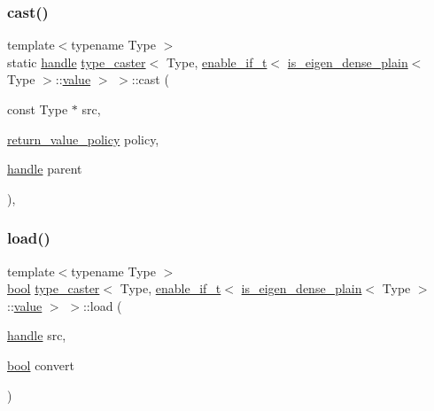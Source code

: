 \subsubsection{\texorpdfstring{cast()}{cast()}\hspace{0.1cm}{\footnotesize\ttfamily [6/6]}}
{\footnotesize\ttfamily template$<$typename Type $>$ \\
static \mbox{\hyperlink{classhandle}{handle}} \mbox{\hyperlink{classtype__caster}{type\+\_\+caster}}$<$ Type, \mbox{\hyperlink{detail_2common_8h_a012819c9e8b5e04872a271f50f8b8196}{enable\+\_\+if\+\_\+t}}$<$ \mbox{\hyperlink{eigen_8h_a93c6985faade6e9052f9e0917826b26d}{is\+\_\+eigen\+\_\+dense\+\_\+plain}}$<$ Type $>$\+::\mbox{\hyperlink{_s_d_l__opengl__glext_8h_a8ad81492d410ff2ac11f754f4042150f}{value}} $>$ $>$\+::cast (\begin{DoxyParamCaption}\item[{const Type $\ast$}]{src,  }\item[{\mbox{\hyperlink{detail_2common_8h_adde72ab1fb0dd4b48a5232c349a53841}{return\+\_\+value\+\_\+policy}}}]{policy,  }\item[{\mbox{\hyperlink{classhandle}{handle}}}]{parent }\end{DoxyParamCaption})\hspace{0.3cm}{\ttfamily [inline]}, {\ttfamily [static]}}

\mbox{\label{structtype__caster_3_01_type_00_01enable__if__t_3_01is__eigen__dense__plain_3_01_type_01_4_1_1value_01_4_01_4_a685eaafb5ace9e29ba92080349ee523d}} 
\subsubsection{\texorpdfstring{load()}{load()}}
{\footnotesize\ttfamily template$<$typename Type $>$ \\
\mbox{\hyperlink{asdl_8h_af6a258d8f3ee5206d682d799316314b1}{bool}} \mbox{\hyperlink{classtype__caster}{type\+\_\+caster}}$<$ Type, \mbox{\hyperlink{detail_2common_8h_a012819c9e8b5e04872a271f50f8b8196}{enable\+\_\+if\+\_\+t}}$<$ \mbox{\hyperlink{eigen_8h_a93c6985faade6e9052f9e0917826b26d}{is\+\_\+eigen\+\_\+dense\+\_\+plain}}$<$ Type $>$\+::\mbox{\hyperlink{_s_d_l__opengl__glext_8h_a8ad81492d410ff2ac11f754f4042150f}{value}} $>$ $>$\+::load (\begin{DoxyParamCaption}\item[{\mbox{\hyperlink{classhandle}{handle}}}]{src,  }\item[{\mbox{\hyperlink{asdl_8h_af6a258d8f3ee5206d682d799316314b1}{bool}}}]{convert }\end{DoxyParamCaption})\hspace{0.3cm}{\ttfamily [inline]}}

